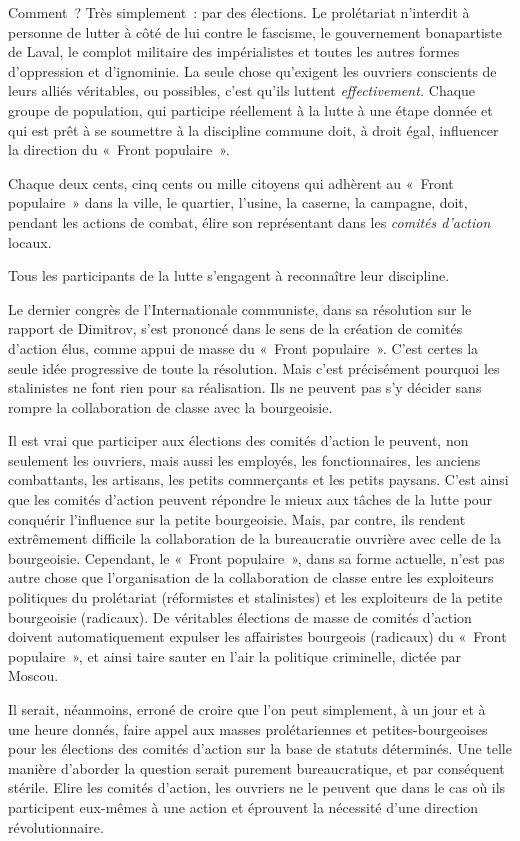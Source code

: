 \documentclass[french,twoside]{book} %
\begin{document}
Comment ? Très simplement : par des élections. Le prolétariat n’interdit à personne de lutter à côté de lui contre le fascisme, le gouvernement bonapartiste de Laval, le complot militaire des impérialistes et toutes les autres formes d’oppression et d’ignominie. La seule chose qu’exigent  les ouvriers conscients de leurs alliés véritables, ou possibles, c’est qu’ils luttent \emph{effectivement.} Chaque groupe de population, qui participe réellement à la lutte à une étape donnée et qui est prêt à se soumettre à la discipline commune doit, à droit égal, influencer la direction du « Front populaire ».\par
Chaque deux cents, cinq cents ou mille citoyens qui adhèrent au « Front populaire » dans la ville, le quartier, l’usine, la caserne, la campagne, doit, pendant les actions de combat, élire son représentant dans les \emph{comités d’action} locaux.\par
Tous les participants de la lutte s’engagent à reconnaître leur discipline.\par
Le dernier congrès de l’Internationale communiste, dans sa résolution sur le rapport de Dimitrov, s’est prononcé dans le sens de la création de comités d’action élus, comme appui de masse du « Front populaire ». C’est certes la seule idée progressive de toute la résolution. Mais c’est précisément pourquoi les stalinistes ne font rien pour sa réalisation. Ils ne peuvent pas s’y décider sans rompre la collaboration de classe avec la bourgeoisie.\par
Il est vrai que participer aux élections des comités d’action le peuvent, non seulement les ouvriers, mais aussi les employés, les fonctionnaires, les anciens combattants, les artisans, les petits commerçants et les petits paysans. C’est ainsi que les comités d’action peuvent répondre le mieux aux tâches de la lutte pour conquérir l’influence sur la petite bourgeoisie. Mais, par contre, ils rendent extrêmement difficile la collaboration de la bureaucratie ouvrière avec celle de la bourgeoisie. Cependant, le « Front populaire », dans sa forme actuelle, n’est pas autre chose que l’organisation de la collaboration de classe entre les exploiteurs politiques du prolétariat (réformistes et stalinistes) et les exploiteurs de la petite bourgeoisie (radicaux). De véritables élections de masse de comités d’action  doivent automatiquement expulser les affairistes bourgeois (radicaux) du « Front populaire », et ainsi taire sauter en l’air la politique criminelle, dictée par Moscou.\par
Il serait, néanmoins, erroné de croire que l’on peut simplement, à un jour et à une heure donnés, faire appel aux masses prolétariennes et petites-bourgeoises pour les élections des comités d’action sur la base de statuts déterminés. Une telle manière d’aborder la question serait purement bureaucratique, et par conséquent stérile. Elire les comités d’action, les ouvriers ne le peuvent que dans le cas où ils participent eux-mêmes à une action et éprouvent la nécessité d’une direction révolutionnaire.\par
\end{document}
